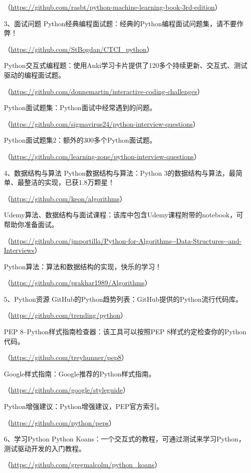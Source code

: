 \documentclass[]{ctexbook}
\begin{document}
（\url{https://github.com/rasbt/python-machine-learning-book-3rd-edition}）

3、面试问题
Python经典编程面试题：经典的Python编程面试问题集，请不要作弊！

（\url{https://github.com/StBogdan/CTCI_python}）

Python交互式编程题：使用Anki学习卡片提供了120多个持续更新、交互式、测试驱动的编程面试题。

（\url{https://github.com/donnemartin/interactive-coding-challenges}）

Python面试题集：Python面试中经常遇到的问题。

（\url{https://github.com/sigmavirus24/python-interview-questions}）

Python面试题集2：额外的300多个Python面试题。

（\url{https://github.com/learning-zone/python-interview-questions}）

4、数据结构与算法
Python数据结构与算法：Python 3的数据结构与算法，最简单、最整洁的实现，已获1.8万颗星！

（\url{https://github.com/keon/algorithms}）

Udemy算法、数据结构与面试课程：该库中包含Udemy课程附带的notebook，可帮助你准备面试。

（\url{https://github.com/jmportilla/Python-for-Algorithms--Data-Structures--and-Interviews}）

Python算法：算法和数据结构的实现，快乐的学习！

（\url{https://github.com/prakhar1989/Algorithms}）

5、Python资源
GitHub的Python趋势列表：GitHub提供的Python流行代码库。

（\url{https://github.com/trending/python}）

PEP 8--Python样式指南检查器：该工具可以按照PEP 8样式约定检查你的Python代码。

（\url{https://github.com/treyhunner/pep8}）

Google样式指南：Google推荐的Python样式指南。

（\url{https://github.com/google/styleguide}）

Python增强建议：Python增强建议，PEP官方索引。

（\url{https://github.com/python/peps}）

6、学习Python
Python Koans：一个交互式的教程，可通过测试来学习Python，测试驱动开发的入门教程。

（\url{https://github.com/gregmalcolm/python_koans}）
\end{document}
